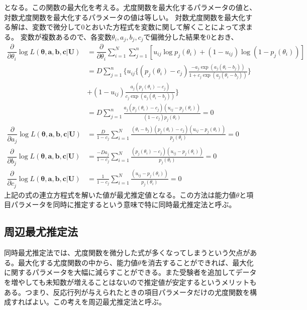 \documentclass[12pt]{jarticle}
\numberwithin{equation}{subsection}
\begin{document}
となる。この関数の最大化を考える。尤度関数を最大化するパラメータの値と、対数尤度関数を最大化するパラメータの値は等しい。
対数尤度関数を最大化する解は、変数で微分して$0$とおいた方程式を変数に関して解くことによって求まる。
変数が複数あるので、各変数$\theta_i,a_j,b_j,c_j$で偏微分した結果を$0$とおき、
\begin{align}
  \displaystyle \dfrac{\partial }{\partial \theta_i} \log L(\boldsymbol{\theta},\boldsymbol{a},\boldsymbol{b},\boldsymbol{c}|\boldsymbol{U}) &= \dfrac{\partial }{\partial \theta_i} \sum_{i = 1}^{N} \sum_{j = 1}^{n} [u_{ij} \log p_j(\theta_i) + (1 - u_{ij})\log (1 - p_j(\theta_i))]\nonumber \\ &= D\sum_{j = 1}^{n} \{u_{ij}\{(p_j(\theta_i)- c_j)\frac{-a_j\exp(a_j(\theta_i - b_j))}{1 + c_j \exp(a_j(\theta_i - b_j))}\} \nonumber \\ &+ (1 - u_{ij})\frac{a_j(p_j(\theta_i) - c_j)}{c_j\exp(a_j(\theta_i - b_j))}\}
  \nonumber \\ &=  D\sum_{j = 1}^{n} \frac{a_j(p_j(\theta_i) - c_j)(u_{ij} - p_j(\theta_i))}{(1 - c_j)p_j(\theta_i)}=0     \\
  \displaystyle \dfrac{\partial }{\partial a_j} \log L(\boldsymbol{\theta},\boldsymbol{a},\boldsymbol{b},\boldsymbol{c}|\boldsymbol{U}) &= \frac{D}{1 - c_j}\sum_{i = 1}^{N} \frac{(\theta_i - b_j)(p_j(\theta_i) - c_j)(u_{ij} - p_j(\theta_i))}{p_j(\theta_i)}=0    \\
  \displaystyle \dfrac{\partial }{\partial b_j} \log L(\boldsymbol{\theta},\boldsymbol{a},\boldsymbol{b},\boldsymbol{c}|\boldsymbol{U}) &= \frac{-Da_j}{1 - c_j}\sum_{i = 1}^{N} \frac{(p_j(\theta_i) - c_j)(u_{ij} - p_j(\theta_i))}{p_j(\theta_i)}=0    \\
  \displaystyle \dfrac{\partial }{\partial c_j} \log L(\boldsymbol{\theta},\boldsymbol{a},\boldsymbol{b},\boldsymbol{c}|\boldsymbol{U}) &= \frac{1}{1 - c_j}\sum_{i = 1}^{N} \frac{(u_{ij} - p_j(\theta_i))}{p_j(\theta_i)}=0
\end{align}
上記の式の連立方程式を解いた値が最尤推定値となる。この方法は能力値$\theta$と項目パラメータを同時に推定するという意味で特に同時最尤推定法と呼ぶ。
\subsection{周辺最尤推定法}
同時最尤推定法では、尤度関数を微分した式が多くなってしまうという欠点がある。最大化する尤度関数の中から、能力値$\theta$を消去することができれば、最大化に関するパラメータを大幅に減らすことができる。また受験者を追加してデータを増やしても未知数が増えることはないので推定値が安定するというメリットもある。つまり、反応行列が与えられたときの項目パラメータだけの尤度関数を構成すればよい。この考えを周辺最尤推定法と呼ぶ。
\end{document}
